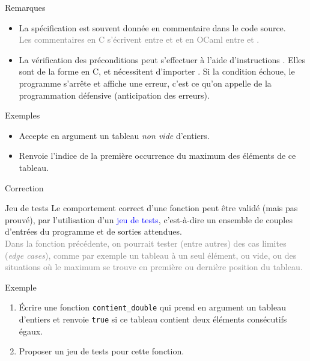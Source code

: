 \documentclass[10pt,french]{beamer}
\begin{document}
\begin{frame}{\Ctitle}{\stitle}
\begin{block}{Remarques}
\begin{itemize}
\item<1-> La spécification est souvent donnée en commentaire dans le code source. \\
 \textcolor{gray}{Les commentaires en C s'écrivent entre \kw{/*} et \kw{*/} et en OCaml entre \kw{(*} et \kw{*)}.}
\item<3-> La vérification des préconditions peut s'effectuer à l'aide d'instructions . Elles sont de la forme  en C, et nécessitent d'importer . Si la condition échoue, le programme s'arrête et affiche une erreur, c'est ce qu'on appelle de la programmation défensive (anticipation des erreurs).
\end{itemize}
\end{block}
\begin{exampleblock}{Exemples}
\begin{itemize}
	\item<5-> Accepte en argument un tableau \textit{non vide} d'entiers.
	\item<6-> Renvoie l'indice de la première occurrence du maximum des éléments de ce tableau.
\end{itemize}
\end{exampleblock}
\end{frame}


\begin{frame}{\Ctitle}{\stitle}
	\begin{exampleblock}{Correction}
	\end{exampleblock}
\end{frame}

\begin{frame}{\Ctitle}{\stitle}
	\begin{block}{Jeu de tests}
		\onslide<1->Le comportement correct d'une fonction peut être \og validé \fg{} (mais pas prouvé), par l'utilisation d'un \textcolor{blue}{jeu de tests}, c'est-à-dire un ensemble de couples d'entrées du programme et de sorties attendues. \\
		\onslide<2->\textcolor{gray}{Dans la fonction précédente, on pourrait tester (entre autres) des cas limites (\textit{edge cases}), comme par exemple un tableau à un seul élément, ou vide, ou des situations où le maximum se trouve en première ou dernière position du tableau.}
	\end{block}
	\begin{exampleblock}{Exemple}
		\begin{enumerate}
		\item<3-> Écrire une fonction {\tt contient\_double} qui prend en argument un tableau d'entiers et renvoie {\tt true} si ce tableau contient deux éléments consécutifs égaux.
		\item<4-> Proposer un jeu de tests pour cette fonction.
		\end{enumerate}
	\end{exampleblock}
\end{frame}
\end{document}
